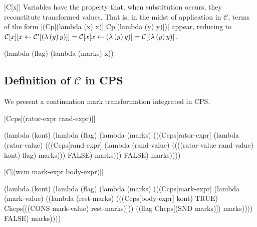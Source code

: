 \begin{schemedefinition}{\scheme|C[x]|}
\noindent
Variables have the property that, when substitution occurs, they reconstitute transformed values. That is, in the midst of application in $\mathcal{C}$, terms of the form \scheme|(Cp[(lambda (x) x)] Cp[(lambda (y) y)])| appear, reducing to $\mathcal{C}[x][x\leftarrow \mathcal{C}'[(\lambda\,(y)\,y)]]=\mathcal{C}[x[x\leftarrow(\lambda\,(y)\,y)]=\mathcal{C}[(\lambda\,(y)\,y)]$.
\begin{schemeblock}
\begin{schemedisplay}
(lambda (flag)
  (lambda (marks)
    x))
\end{schemedisplay}
\end{schemeblock}
\end{schemedefinition}

\subsection{Definition of $\mathcal{C}$ in CPS}

We present a continuation mark transformation integrated in CPS.

\begin{schemedefinition}{\scheme|Ccps[(rator-expr rand-expr)]|}
\begin{schemeblock}
\begin{schemedisplay}
(lambda (kont)
   (lambda (flag)
     (lambda (marks)
       (((Ccps[rator-expr]
          (lambda (rator-value)
            (((Ccps[rand-expr]
               (lambda (rand-value)
                 ((((rator-value rand-value) kont) flag) marks)))
              FALSE) marks)))
         FALSE) marks))))
\end{schemedisplay}
\end{schemeblock}
\end{schemedefinition}

\begin{schemedefinition}{\scheme|C[(wcm mark-expr body-expr)]|}
\begin{schemeblock}
\begin{schemedisplay}
(lambda (kont)
  (lambda (flag)
    (lambda (marks)
      (((Ccps[mark-expr]
          (lambda (mark-value) 
            ((lambda (rest-marks) 
               (((Ccps[body-expr] kont) TRUE) Chcps[((CONS mark-value) rest-marks)]))
             ((flag Chcps[(SND marks)]) marks))))
        FALSE) marks))))
\end{schemedisplay}
\end{schemeblock}
\end{schemedefinition}

